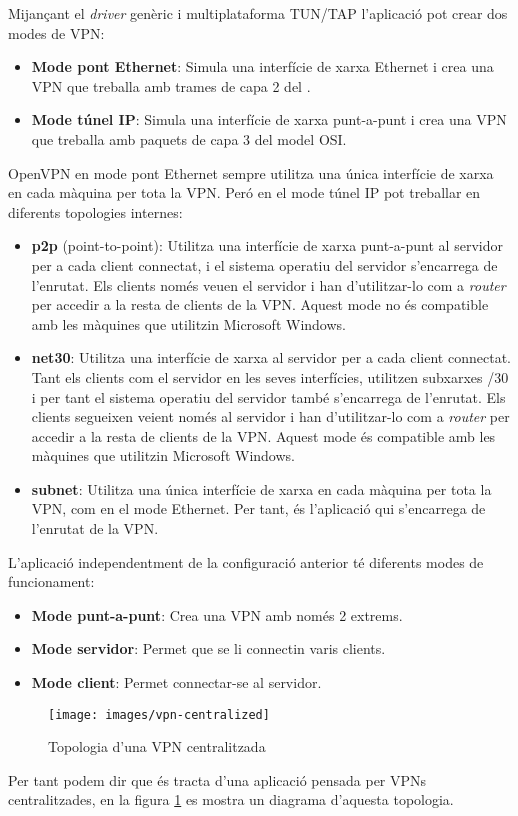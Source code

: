 Mijançant el \emph{driver} genèric i multiplataforma TUN/TAP l'aplicació pot crear dos modes de VPN:
\begin{itemize}
\item \textbf{Mode pont Ethernet}:
Simula una interfície de xarxa Ethernet i crea una VPN que treballa amb trames de capa 2 del .
\item \textbf{Mode túnel IP}:
Simula una interfície de xarxa punt-a-punt i crea una VPN que treballa amb paquets de capa 3 del model OSI.
\end{itemize}

OpenVPN en mode pont Ethernet sempre utilitza una única interfície de xarxa en cada màquina per tota la VPN. Peró en el mode túnel IP pot treballar en diferents topologies internes:
\begin{itemize}
\item \textbf{p2p} (point-to-point): Utilitza una interfície de xarxa punt-a-punt al servidor per a cada client connectat, i el sistema operatiu del servidor s'encarrega de l'enrutat. Els clients només veuen el servidor i han d'utilitzar-lo com a \emph{router} per accedir a la resta de clients de la VPN. Aquest mode no és compatible amb les màquines que utilitzin Microsoft Windows.
\item \textbf{net30}: Utilitza una interfície de xarxa al servidor per a cada client connectat. Tant els clients com el servidor en les seves interfícies, utilitzen subxarxes /30 i per tant el sistema operatiu del servidor també s'encarrega de l'enrutat. Els clients segueixen veient només al servidor i han d'utilitzar-lo com a \emph{router} per accedir a la resta de clients de la VPN. Aquest mode és compatible amb les màquines que utilitzin Microsoft Windows.
\item \textbf{subnet}: Utilitza una única interfície de xarxa en cada màquina per tota la VPN, com en el mode Ethernet. Per tant, és l'aplicació qui s'encarrega de l'enrutat de la VPN.
\end{itemize}

L'aplicació independentment de la configuració anterior té diferents modes de funcionament:
\begin{itemize}
\item \textbf{Mode punt-a-punt}: Crea una VPN amb només 2 extrems.
\item \textbf{Mode servidor}: Permet que se li connectin varis clients.
\item \textbf{Mode client}: Permet connectar-se al servidor.
\end{itemize}
\begin{figure}[htb]
\centering
\texttt{[image: images/vpn-centralized]}
\caption{Topologia d'una VPN centralitzada}
\label{F:vpn-centralized}
\end{figure}
Per tant podem dir que és tracta d'una aplicació pensada per VPNs centralitzades, en la figura \ref{F:vpn-centralized} es mostra un diagrama d'aquesta topologia.


